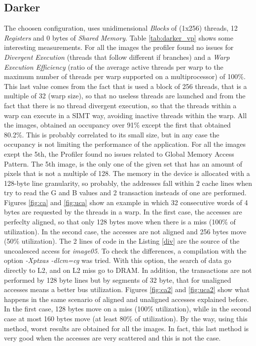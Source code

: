\documentclass[a4paper]{article}
\begin{document}
\subsection{Darker}
\label{sec:a1}
 The choosen configuration, uses unidimensional \textit{Blocks} of (1x256) threads, 12 \textit{Registers} and 0 bytes of \textit{Shared Memory}. Table \ref{tab:darker_vp} shows some interesting measurements.
 For all the images the profiler found no issues for \textit{Divergent Execution} (threads that follow different if branches) and a \textit{Warp Execution Efficiency} (ratio of the average active threads per warp to the maximum number of threads per warp supported on a multiprocessor) of 100\%. This last value comes from the fact that is used a block of 256 threads, that is a multiple of 32 (warp size), so that no useless threads are launched and from the fact that there is no thread divergent execution, so that the threads within a warp can execute in a SIMT way, avoiding inactive threads within the warp. All the images, obtained an occupancy over 91\% except the first that obtained 80.2\%. This is probably correlated to its small size, but in any case the occupancy is not limiting the performance of the application. For all the images exept the 5th, the Profiler found no issues related to Global Memory Access Pattern. The 5th image, is the only one of the given set that has an amount of pixels that is not a multiple of 128. The memory in the device is allocated with a 128-byte line granularity, so probably, the addresses fall within 2 cache lines when try to read the G and B values and 2 transaction insteads of one are performed. Figures \ref{fig:ca} and \ref{fig:uca} show an example in which 32 consecutive words of 4 bytes are requested by the threads in a warp. In the first case, the accesses are perfeclty aligned, so that only 128 bytes move when there is a miss (100\% of utilization). In the second case, the accesses are not aligned and 256 bytes move (50\% utilization). The 2 lines of code in the Listing \ref{div} are the source of the uncoalesced access for \textit{image05}. To check the differences, a compilation with the option \textit{-Xptxas -dlcm=cg} was tried. With this option, the search of data go directly to L2, and on L2 miss go to DRAM. In addition, the transactions are not performed by 128 byte lines but by segments of 32 byte, that for unaligned accesses means a better bus utilization. Figures \ref{fig:ca2} and \ref{fig:uca2} show what happens in the same scenario of aligned and unaligned accesses explained before. In the first case, 128 bytes move on a miss (100\% utilization), while in the second case at most 160 bytes move (at least 80\% of utilization). By the way, using this method, worst results are obtained for all the images. In fact, this last method is very good when the accesses are very scattered and this is not the case.
 
\end{document}
